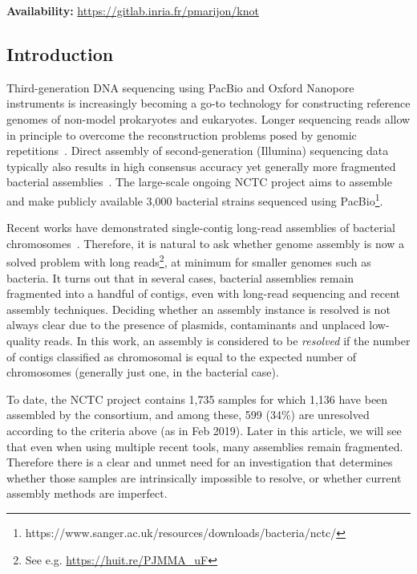 \documentclass[./main.tex]{subfiles}
\newcommand{\modafterreview}[1]{#1}
\begin{document}
\textbf{Availability:} \url{https://gitlab.inria.fr/pmarijon/knot}\\

\subsection{Introduction}
Third-generation DNA sequencing using PacBio and Oxford Nanopore instruments is increasingly becoming a go-to technology for constructing reference genomes of non-model prokaryotes and eukaryotes. Longer sequencing reads allow in principle to overcome the reconstruction problems posed by genomic repetitions~\citep{tse}. Direct assembly of second-generation (Illumina) sequencing data typically also results in \modafterreview{high consensus accuracy} yet generally more fragmented bacterial assemblies~\citep{spades}. 
The large-scale ongoing NCTC project aims to assemble and make publicly available 3,000 bacterial strains sequenced using PacBio\footnote{https://www.sanger.ac.uk/resources/downloads/bacteria/nctc/}.


Recent works have demonstrated single-contig long-read assemblies of bacterial chromosomes~\citep{1chr1contig,loman2015complete}. 
Therefore, it is natural to ask whether genome assembly is now a solved problem with long reads\footnote{See e.g. \url{https://huit.re/PJMMA_uF}}, at minimum for smaller genomes such as bacteria. It turns out that in several cases, bacterial assemblies remain fragmented into a handful of contigs, even with long-read sequencing and recent assembly techniques. 
Deciding whether an assembly instance is resolved is not always clear due to the presence of plasmids, contaminants and unplaced low-quality reads. In this work, an assembly is considered to be \emph{resolved} if the number of contigs classified as chromosomal is equal to the expected number of chromosomes (generally \modafterreview{just} one, in the bacterial case).

 To date, the NCTC project contains 1,735 samples for which 1,136 have been assembled by the consortium, and among these, 599 (34\%) are unresolved according to the criteria above (as in Feb 2019). Later in this article, we will see that even when using multiple recent tools, many assemblies remain fragmented. Therefore there is a clear and unmet need for an investigation that determines whether those samples are intrinsically impossible to resolve, or whether current assembly methods are imperfect.
\end{document}
